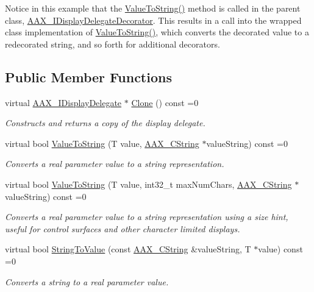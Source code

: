 Notice in this example that the \mbox{\hyperlink{a01805_ada5780cfa332ac7946bf95aa65ae96f5}{Value\+To\+String()}} method is called in the parent class, \mbox{\hyperlink{a01805}{A\+A\+X\+\_\+\+I\+Display\+Delegate\+Decorator}}. This results in a call into the wrapped class\textquotesingle{} implementation of \mbox{\hyperlink{a01805_ada5780cfa332ac7946bf95aa65ae96f5}{Value\+To\+String()}}, which converts the decorated value to a redecorated string, and so forth for additional decorators. \subsection*{Public Member Functions}
\begin{DoxyCompactItemize}
\item 
virtual \mbox{\hyperlink{a01801}{A\+A\+X\+\_\+\+I\+Display\+Delegate}} $\ast$ \mbox{\hyperlink{a01801_a138a82c124ddda8255ce39194dfc1f3f}{Clone}} () const =0
\begin{DoxyCompactList}\small\item\em Constructs and returns a copy of the display delegate. \end{DoxyCompactList}\item 
virtual bool \mbox{\hyperlink{a01801_a7fd1e2f55055c817937bbfa66b73b2fd}{Value\+To\+String}} (T value, \mbox{\hyperlink{a01573}{A\+A\+X\+\_\+\+C\+String}} $\ast$value\+String) const =0
\begin{DoxyCompactList}\small\item\em Converts a real parameter value to a string representation. \end{DoxyCompactList}\item 
virtual bool \mbox{\hyperlink{a01801_a471c7381db773683b69216a9c3f5eda7}{Value\+To\+String}} (T value, int32\+\_\+t max\+Num\+Chars, \mbox{\hyperlink{a01573}{A\+A\+X\+\_\+\+C\+String}} $\ast$value\+String) const =0
\begin{DoxyCompactList}\small\item\em Converts a real parameter value to a string representation using a size hint, useful for control surfaces and other character limited displays. \end{DoxyCompactList}\item 
virtual bool \mbox{\hyperlink{a01801_aed5224775c9f733f091afddfba057d5e}{String\+To\+Value}} (const \mbox{\hyperlink{a01573}{A\+A\+X\+\_\+\+C\+String}} \&value\+String, T $\ast$value) const =0
\begin{DoxyCompactList}\small\item\em Converts a string to a real parameter value. \end{DoxyCompactList}\end{DoxyCompactItemize}


